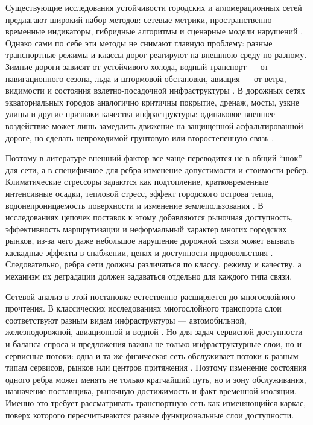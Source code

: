 Существующие исследования устойчивости городских и агломерационных сетей
предлагают широкий набор методов: сетевые метрики, пространственно-временные
индикаторы, гибридные алгоритмы и сценарные модели нарушений
\cite{huang2022ecologicalNetwork,lu2022urbanAgglomResilience,
ji2024urbanFloodResilience}. Однако сами по себе эти методы не снимают
главную проблему: разные транспортные режимы и классы дорог реагируют на внешнюю
среду по-разному. Зимние дороги зависят от устойчивого холода, водный
транспорт --- от навигационного сезона, льда и штормовой обстановки, авиация
--- от ветра, видимости и состояния взлетно-посадочной инфраструктуры
\cite{touloumidis2025weatherDisruptions,burbidge2024aviationClimate,
gu2025busSnowfall,rahman2025climateAwareDecision}. В дорожных сетях
экваториальных городов аналогично критичны покрытие, дренаж, мосты,
узкие улицы и другие признаки качества инфраструктуры: одинаковое внешнее
воздействие может лишь замедлить движение на защищенной асфальтированной
дороге, но сделать непроходимой грунтовую или второстепенную связь
\cite{pregnolato2017pluvialFlooding,lher2023brazilAgriculturalTransport,
wei2022coastalTrafficResilience}.

Поэтому в литературе внешний фактор все чаще переводится не в общий
``шок'' для сети, а в специфичное для ребра изменение допустимости и стоимости
ребер. Климатические стрессоры задаются как подтопление, кратковременные
интенсивные осадки, тепловой стресс, эффект городского острова тепла,
водонепроницаемость поверхности и изменение землепользования
\cite{pregnolato2017pluvialFlooding,arifai2025urbanExpansion,
wei2022coastalTrafficResilience}. В исследованиях цепочек поставок к этому добавляются
рыночная доступность, эффективность маршрутизации и неформальный характер многих
городских рынков, из-за чего даже небольшое нарушение дорожной связи может
вызвать каскадные эффекты в снабжении, ценах и доступности продовольствия
\cite{colon2019tanzaniaSupplyChain,ofori2022accraFoodFlows,
karg2022foodsheds}. Следовательно, ребра сети должны различаться по классу,
режиму и качеству, а механизм их деградации должен задаваться отдельно для
каждого типа связи.

Сетевой анализ в этой постановке естественно расширяется до многослойного
прочтения. В классических исследованиях многослойного транспорта слои соответствуют
разным видам инфраструктуры --- автомобильной, железнодорожной, авиационной и водной
\cite{li2025multilayerReview,mei2025multilayerRobustness,
ye2025multilayerIntercityRoad}. Но для задач сервисной доступности и баланса спроса и предложения
важны не только инфраструктурные слои, но и сервисные потоки: одна и та
же физическая сеть обслуживает потоки к разным типам сервисов, рынков или
центров притяжения \cite{mishina2024urbanAccessibility}. Поэтому изменение
состояния одного ребра может менять не только кратчайший путь, но и зону
обслуживания, назначение поставщика, рыночную достижимость и факт временной
изоляции. Именно это требует рассматривать транспортную сеть как
изменяющийся каркас, поверх которого пересчитываются разные функциональные
слои доступности.

